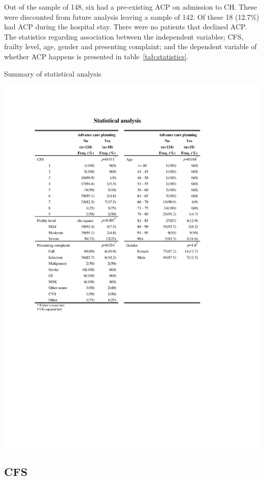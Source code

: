 \documentclass
[
	12pt,
	a4paper,
	oneside,
]{report}
\begin{document}
Out of the sample of 148, six had a pre-existing ACP on admission to CH. These 
were discounted from future analysis leaving a sample of 142. Of these 18 
(12.7\%) had ACP during the hospital stay. There were no patients that 
declined ACP. The statistics regarding association between the independent 
variables; CFS, frailty level, age, gender and presenting complaint; and the 
dependent variable of whether ACP happens is presented in 
table~\ref{tab:statistics}.

\begin{table}[ht]
\caption{Summary of statistical analysis}
\label{tab:statistics}
\includegraphics[width=\textwidth,
	trim={2.5cm 10cm 2.5cm 2.5cm},
	clip]{media/statistical-analysis}
\end{table}

\subsection{CFS}
\end{document}

